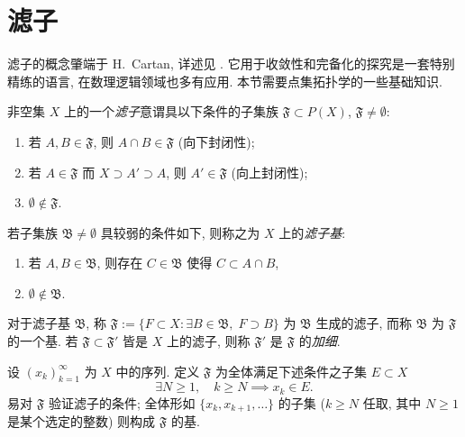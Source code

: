 \section{滤子}\label{sec:filters}
滤子的概念肇端于 H.\ Cartan, 详述见 \cite{Bou-Top1}. 它用于收敛性和完备化的探究是一套特别精练的语言, 在数理逻辑领域也多有应用. 本节需要点集拓扑学的一些基础知识.

\begin{definition}
	非空集 $X$ 上的一个\emph{滤子}意谓具以下条件的子集族 $\mathfrak{F} \subset P(X)$, $\mathfrak{F} \neq \emptyset$:
	\begin{enumerate}[\bfseries {F}.1]
		\item 若 $A, B \in \mathfrak{F}$, 则 $A \cap B \in \mathfrak{F}$ (向下封闭性);
		\item 若 $A \in \mathfrak{F}$ 而 $X \supset A' \supset A$, 则 $A' \in \mathfrak{F}$ (向上封闭性);
		\item $\emptyset \notin \mathfrak{F}$.
	\end{enumerate}
	若子集族 $\mathfrak{B} \neq \emptyset$ 具较弱的条件如下, 则称之为 $X$ 上的\emph{滤子基}:
	\begin{enumerate}[\bfseries {FB}.1]
		\item 若 $A, B \in \mathfrak{B}$, 则存在 $C \in \mathfrak{B}$ 使得 $C \subset A \cap B$,
		\item $\emptyset \notin \mathfrak{B}$.
	\end{enumerate}
	对于滤子基 $\mathfrak{B}$, 称 $\mathfrak{F} := \{ F \subset X: \exists B \in \mathfrak{B},\; F \supset B \}$ 为 $\mathfrak{B}$ 生成的滤子, 而称 $\mathfrak{B}$ 为 $\mathfrak{F}$ 的一个基. 若 $\mathfrak{F} \subset \mathfrak{F}'$ 皆是 $X$ 上的滤子, 则称 $\mathfrak{F}'$ 是 $\mathfrak{F}$ 的\emph{加细}.
\end{definition}

\begin{example}\label{eg:sequence-as-filter}
	设 $(x_k)_{k=1}^\infty$ 为 $X$ 中的序列. 定义 $\mathfrak{F}$ 为全体满足下述条件之子集 $E \subset X$
	\[ \exists N \geq 1, \quad k \geq N \implies x_k \in E . \]
	易对 $\mathfrak{F}$ 验证滤子的条件; 全体形如 $\{ x_k, x_{k+1}, \ldots\}$ 的子集 ($k \geq N$ 任取, 其中 $N \geq 1$ 是某个选定的整数) 则构成 $\mathfrak{F}$ 的基.
\end{example}

